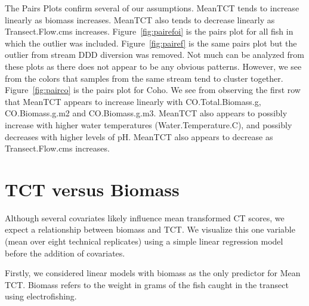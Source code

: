 \newpage

The Pairs Plots confirm several of our assumptions. MeanTCT tends to increase linearly as biomass increases. MeanTCT also tends to decrease linearly as Transect.Flow.cms increases. Figure~\ref{fig:pairefoi} is the pairs plot for all fish in which the outlier was included. Figure~\ref{fig:pairef} is the same pairs plot but the outlier from stream DDD diversion was removed. Not much can be analyzed from these plots as there does not appear to be any obvious patterns. However, we see from the colors that samples from the same stream tend to cluster together. Figure~\ref{fig:pairco} is the pairs plot for Coho. We see from observing the first row that MeanTCT appears to increase linearly with CO.Total.Biomass.g, CO.Biomass.g.m2 and CO.Biomass.g.m3. MeanTCT also appears to possibly increase with higher water temperatures (Water.Temperature.C), and possibly decreases with higher levels of pH. MeanTCT also appears to decrease as Transect.Flow.cms increases.



\newpage

\section{TCT versus Biomass}

Although several covariates likely influence mean transformed CT scores, we expect a relationship between biomass and TCT. We visualize this one variable (mean over eight technical replicates) using a simple linear regression model before the addition of covariates.


Firstly, we considered linear models with biomass as the only predictor for Mean TCT.  Biomass refers to the weight in grams of the fish caught in the transect using electrofishing. 

\vspace{3mm}



